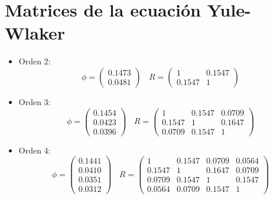 \section{Matrices de la ecuación Yule-Wlaker}
\begin{itemize}

\item Orden 2:
\begin{equation*}
	\phi = 
	\begin{pmatrix}
		0.1473 \\
		0.0481  
	\end{pmatrix}	\	\	\	\
	R =
	\begin{pmatrix}
		1 & 0.1547 \\
		0.1547 & 1					  
	\end{pmatrix}
\end{equation*}

\item Orden 3:
\begin{equation*}
	\phi = 
	\begin{pmatrix}
		0.1454 \\
		0.0423 \\
		0.0396  
	\end{pmatrix}	\	\	\	\
	R =
	\begin{pmatrix}
		1 		& 0.1547 	& 0.0709 \\
		0.1547 	& 1 		& 0.1647 \\
		0.0709 	& 0.1547 	& 1					  
	\end{pmatrix}
\end{equation*}

\item Orden 4:
\begin{equation*}
	\phi = 
	\begin{pmatrix}
		0.1441 \\
		0.0410 \\
		0.0351 \\
		0.0312
	\end{pmatrix}	\	\	\	\
	R =
	\begin{pmatrix}
		1 		& 0.1547 	& 0.0709 	& 0.0564 \\
		0.1547 	& 1 		& 0.1647 	& 0.0709 \\
		0.0709 	& 0.1547 	& 1			& 0.1547 \\
		0.0564	& 0.0709	& 0.1547	& 1		  
	\end{pmatrix}
\end{equation*}


\end{itemize}
